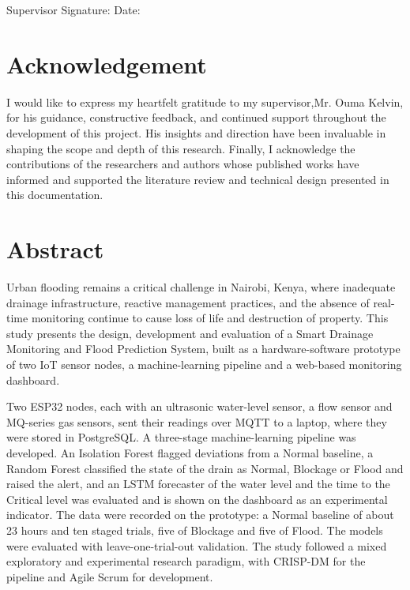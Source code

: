 \documentclass[12pt, a4paper]{article}
\begin{document}
\vspace{2cm}

Supervisor Signature:
\underline{\hspace{3.5cm}}
\hspace{1cm}
Date: \underline{}

\vspace{2cm}

\clearpage
\section*{Acknowledgement}
I would like to express my heartfelt gratitude to my supervisor,Mr. Ouma Kelvin, for his guidance, constructive feedback, and continued support throughout the development of this project. His insights and direction have been invaluable in shaping the scope and depth of this research.
Finally, I acknowledge the contributions of the researchers and authors whose published works have informed and supported the literature review and technical design presented in this documentation.
\clearpage
\section*{Abstract}

Urban flooding remains a critical challenge in Nairobi, Kenya, where inadequate drainage infrastructure, reactive management practices, and the absence of real-time monitoring continue to cause loss of life and destruction of property. This study presents the design, development and evaluation of a Smart Drainage Monitoring and Flood Prediction System, built as a hardware-software prototype of two IoT sensor nodes, a machine-learning pipeline and a web-based monitoring dashboard.

Two ESP32 nodes, each with an ultrasonic water-level sensor, a flow sensor and MQ-series gas sensors, sent their readings over MQTT to a laptop, where they were stored in PostgreSQL. A three-stage machine-learning pipeline was developed. An Isolation Forest flagged deviations from a Normal baseline, a Random Forest classified the state of the drain as Normal, Blockage or Flood and raised the alert, and an LSTM forecaster of the water level and the time to the Critical level was evaluated and is shown on the dashboard as an experimental indicator. The data were recorded on the prototype: a Normal baseline of about 23 hours and ten staged trials, five of Blockage and five of Flood. The models were evaluated with leave-one-trial-out validation. The study followed a mixed exploratory and experimental research paradigm, with CRISP-DM for the pipeline and Agile Scrum for development.
\end{document}
